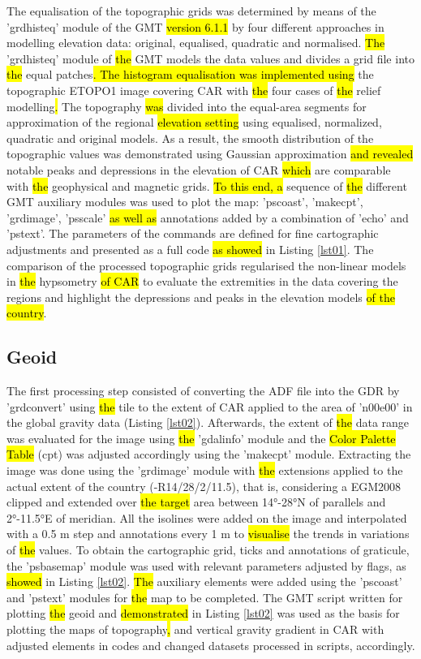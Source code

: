 \documentclass[minerals,article,submit,pdftex,moreauthors]{Definitions/mdpi}
\begin{document}
The equalisation of the topographic grids was determined by means of the 'grdhisteq' module of the GMT \hl{version 6.1.1 }\cite{WesselSmith1991,Wessel} by four different approaches in modelling elevation data: original, equalised, quadratic and normalised. \hl{The} ’grdhisteq’ module of \hl{the }GMT\hl{ }models the data values and divides a grid file into \hl{the }equal patches\hl{. The histogram equalisation was implemented using }the topographic ETOPO1 image covering CAR with \hl{the }four cases of \hl{the }relief modelling\hl{. }The topography \hl{was }divided into the equal-area segments for approximation of the regional \hl{elevation setting} using equalised, normalized, quadratic and original models. As a result,\hl{ }the smooth distribution of the topographic values was demonstrated\hl{ }using Gaussian approximation\hl{ and revealed }notable peaks and depressions in the elevation of CAR \hl{which }are comparable with \hl{the }geophysical and magnetic grids. \hl{To this end, a} sequence of \hl{the }different GMT auxiliary modules was used to plot the map: 'pscoast', 'makecpt', 'grdimage', 'psscale' \hl{as well as }annotations added by a combination of 'echo' and 'pstext'. The parameters of the commands are defined for fine cartographic adjustments and presented as a full code \hl{as showed }in Listing \ref{lst01}. The comparison of the processed topographic grids regularised the non-linear models in \hl{the }hypsometry \hl{of CAR }to evaluate the extremities in the data covering the regions and highlight the depressions and peaks in the elevation models \hl{of the country}.

\subsection{Geoid}
The first processing step consisted of converting the ADF file into the GDR by 'grdconvert' using \hl{the }tile to the extent of CAR applied to the area of 'n00e00' in the global gravity data (Listing \ref{lst02}). Afterwards, the extent of \hl{the }data range was evaluated for the image using \hl{the }'gdalinfo' module and the \hl{Color Palette Table }(cpt) was adjusted accordingly using the 'makecpt' module. Extracting the image was done using the 'grdimage' module with \hl{the }extensions applied to the actual extent of the country (-R14/28/2/11.5), that is, considering a EGM2008 clipped and extended over \hl{the target} area between 14°-28°N of parallels and 2°-11.5°E of meridian. All the isolines were added on the image and interpolated with a 0.5 m step and annotations every 1 m to \hl{visualise} the trends in variations of \hl{the }values. To obtain the cartographic grid, ticks and annotations of graticule, the 'psbasemap' module was used with relevant parameters adjusted by flags, as \hl{showed} in Listing \ref{lst02}. \hl{The }auxiliary elements were added using the 'pscoast' and 'pstext' modules for \hl{the }map to be completed. The GMT script written for plotting \hl{the }geoid and \hl{demonstrated} in Listing \ref{lst02} was used as the basis for plotting the maps of topography\hl{, }and vertical gravity gradient in CAR with adjusted elements in codes and changed datasets processed in scripts, accordingly.
\end{document}
